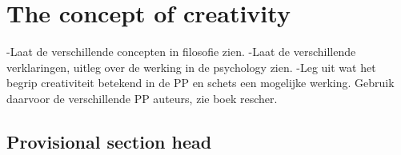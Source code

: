 \documentclass[a4paper]{Thesis}
\begin{document}

%

\bigskip
\bigskip
\tableofcontents














\chapter{The concept of creativity}

-Laat de verschillende concepten in filosofie zien.
-Laat de verschillende verklaringen, uitleg over de werking in de psychology zien.
-Leg uit wat het begrip creativiteit betekend in de PP en schets een mogelijke werking. Gebruik daarvoor de verschillende PP auteurs, zie boek rescher.

\section{Provisional section head}
\end{document}

